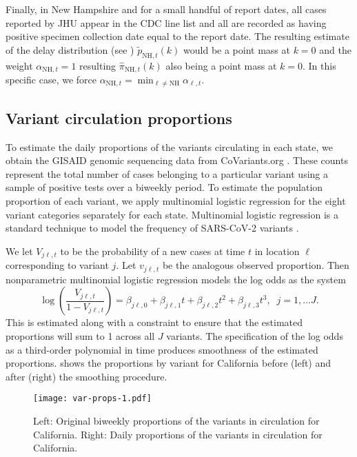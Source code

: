 Finally, in New Hampshire and for a small handful of report dates, all cases
reported by JHU appear in the CDC line list and all are recorded as having
positive specimen collection date equal to the report date. The resulting
estimate of the delay distribution (see )
$\widetilde{p}_{\textrm{NH},t}(k)$ would be a point mass at $k=0$ and the weight
$\alpha_{\textrm{NH},t}=1$ resulting $\widehat\pi_{\textrm{NH},t}(k)$ also being a
point mass at $k=0$. In this specific case, we force $\alpha_{\textrm{NH},t} =
\min_{\ell\neq\textrm{NH}} \alpha_{\ell,t}$.

\subsection{Variant circulation proportions}
\label{sec:variant-proportions}


To estimate the daily proportions of the variants circulating in each state, we
obtain the GISAID genomic sequencing data from CoVariants.org
\citep{hodcroft2021covariants, elbe2017data}. These counts represent the total
number of cases belonging to a particular variant using
a sample of positive tests over a biweekly period. To estimate the population
proportion of each variant, we apply multinomial logistic regression 
for the eight variant categories separately for each state. 
Multinomial logistic regression is a standard technique to model the
frequency of SARS-CoV-2 variants 
\citep{obermeyer2022analysis, annavajhala2021emergence, figgins2021sars}.

We let $V_{j\ell,t}$ to be the probability of a new cases at time $t$ in location
$\ell$ corresponding to variant $j$. Let $v_{j\ell,t}$ be the analogous observed
proportion. Then nonparametric multinomial logistic regression models the log odds
as the system
\begin{equation}
\log\left(\frac{V_{j\ell,t}}{1-V_{j\ell,t}}\right) = \beta_{j\ell,0} + \beta_{j\ell,1} t + \beta_{j\ell,2}t^2 + \beta_{j\ell,3}t^3,\;\; j=1,\ldots J.
\end{equation}
This is estimated along with a constraint to ensure that the estimated proportions will sum to 1 across all
$J$ variants. The specification of the log odds as a third-order polynomial in
time produces smoothness of the estimated proportions.
  shows the proportions by variant for California before
(left) and after (right) the smoothing procedure. 

\begin{figure}[!tb]
    \centering
        \texttt{[image: var-props-1.pdf]}
        \caption{Left: Original biweekly proportions of the variants in circulation
        for California. Right: Daily proportions of the variants in circulation for
        California.}
        \label{fig:prop_figs}
    \end{figure}


